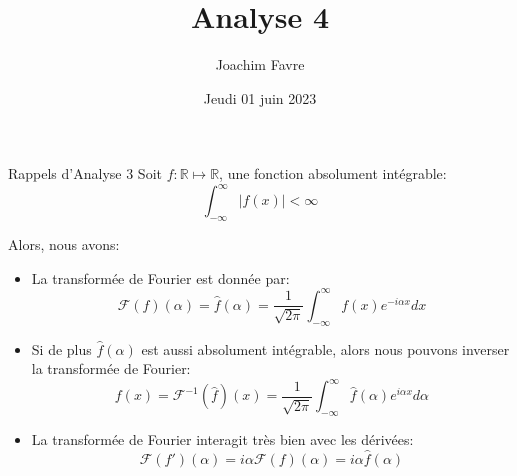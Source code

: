 \documentclass[a4paper]{article}
\title{Analyse 4}
\author{Joachim Favre}
\date{Jeudi 01 juin 2023}
\begin{document}
\maketitle


\begin{parag}{Rappels d'Analyse 3}
    Soit $f: \mathbb{R} \mapsto \mathbb{R}$, une fonction absolument intégrable: 
    \[\int_{-\infty}^{\infty} \left|f\left(x\right)\right| < \infty\]

    Alors, nous avons:
    \begin{itemize}
        \item La transformée de Fourier est donnée par: 
        \[\mathcal{F}\left(f\right)\left(\alpha\right) = \hat{f}\left(\alpha\right) = \frac{1}{\sqrt{2\pi}} \int_{-\infty}^{\infty} f\left(x\right) e^{-i \alpha x}dx\]
        \item Si de plus $\hat{f}\left(\alpha\right)$ est aussi absolument intégrable, alors nous pouvons inverser la transformée de Fourier: 
        \[f\left(x\right) = \mathcal{F}^{-1}\left(\hat{f}\right)\left(x\right) = \frac{1}{\sqrt{2\pi}} \int_{-\infty}^{\infty} \hat{f}\left(\alpha\right)e^{i \alpha x} d\alpha\]
        \item La transformée de Fourier interagit très bien avec les dérivées:
        \[\mathcal{F}\left(f'\right)\left(\alpha\right) = i \alpha \mathcal{F}\left(f\right)\left(\alpha\right) = i \alpha \hat{f}\left(\alpha\right)\]
    \end{itemize}
\end{parag}
\end{document}

